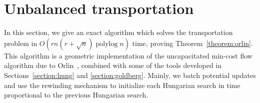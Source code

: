 \documentclass[a4paper,UKenglish]{socg-lipics-v2018}
\def\polylog{\mathop{\mathrm{polylog}}}
\theoremstyle{plain}
\numberwithin{figure}{section}
\begin{document}
%
%
%


\section{Unbalanced transportation}


In this section, we give an exact algorithm which solves the transportation
problem in $O(rn(r + \sqrt{n})\polylog n)$ time, proving
Theorem~\ref{theorem:orlin}.
This algorithm is a geometric implementation of the uncapacitated min-cost flow
algorithm due to Orlin~\cite{O93}, combined with some of the tools developed
in Sections~\ref{section:hung} and \ref{section:goldberg}.
Mainly, we batch potential updates and use the rewinding mechanism to
initialize each Hungarian search in time proportional to the previous
Hungarian search.
\end{document}
